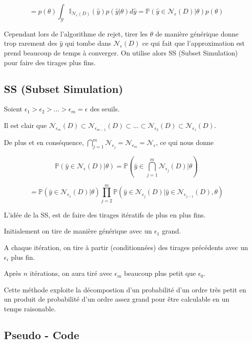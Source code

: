 \documentclass[french,12pt]{article}
\begin{document}
$$ = p( \theta) \int_{\mathcal{Y}} \mathbb{I}_{\mathcal{N}_\epsilon (D)} (\hat{y})  p( \hat{y}| \theta) d \hat{y} = \mathbb{P} (\hat{y} \in \mathcal{N}_{\epsilon} (D)| \theta) p( \theta)$$

Cependant lors de l'algorithme de rejet, tirer les $\theta$ de manière générique donne trop rarement des $\hat{y}$ qui tombe dans $\mathcal{N}_{\epsilon} (D)$
ce qui fait que l'approximation est prend beaucoup de temps à converger. On utilise alors SS (Subset Simulation)
pour faire des tirages plus fins.

\subsection{SS (Subset Simulation)}

Soient $\epsilon_1 > \epsilon_2 > ... >\epsilon_m = \epsilon$ des seuils.

Il est clair que $\mathcal{N}_{\epsilon_m} (D)\subset \mathcal{N}_{\epsilon_{m - 1}} (D) 
\subset ... \subset \mathcal{N}_{\epsilon_{2}} (D) \subset \mathcal{N}_{\epsilon_{1}} (D)$.

De plus et en conséquence, $\bigcap_{j = 1}^m \mathcal{N}_{\epsilon_j} = \mathcal{N}_{\epsilon_m} = \mathcal{N}_{\epsilon} $, ce qui nous donne

$$ \mathbb{P} \left(\hat{y} \in \mathcal{N}_{\epsilon} (D)| \theta \right) = \mathbb{P} \left(\hat{y} \in \bigcap_{j = 1}^m \mathcal{N}_{\epsilon_j} (D)| \theta\right)$$ 

$$= \mathbb{P} \left(\hat{y} \in \mathcal{N}_{\epsilon_1} (D)| \theta\right)
    \prod_{j = 2}^{m} \mathbb{P} \left(\hat{y} \in \mathcal{N}_{\epsilon_j} (D)|\hat{y} \in \mathcal{N}_{\epsilon_{j - 1}} (D), \theta\right)$$


L'idée de la SS, est de faire des tirages itératifs de plus en plus fins.

Initialement on tire de manière générique avec un $\epsilon_1$ grand.

A chaque itération, on tire à partir (conditionnées) des tirages précédents avec un $\epsilon_i$ plus fin.

Après $n$ itérations, on aura tiré avec $\epsilon_m$ beaucoup plus petit que $\epsilon_0$.

Cette méthode exploite la décompostion d'un probabilité d'un ordre très petit
en un produit de probabilité d'un ordre assez grand pour être calculable en un temps raisonable.



\subsection{Pseudo - Code}
\end{document}
